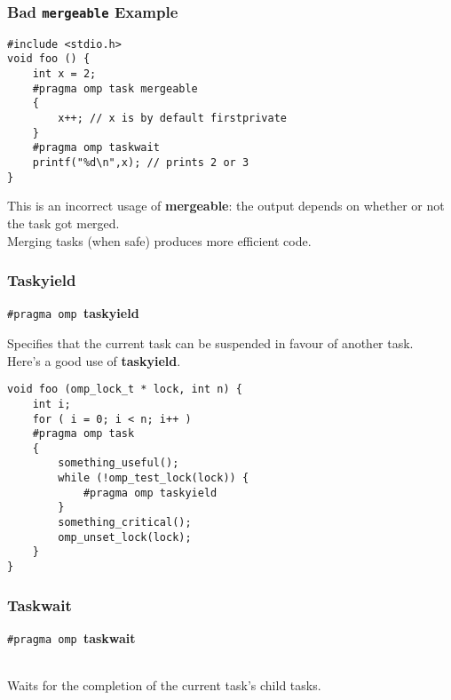 \begin{frame}[fragile]
  \frametitle{Bad {\tt mergeable} Example}

  
  \begin{lstlisting}
#include <stdio.h>
void foo () {
    int x = 2;
    #pragma omp task mergeable
    {
        x++; // x is by default firstprivate
    }
    #pragma omp taskwait
    printf("%d\n",x); // prints 2 or 3
}
  \end{lstlisting}
  
    This is an incorrect usage of {\bf mergeable}: the output depends
      on whether or not the task got merged.\\[1em]
    Merging tasks (when safe) produces more efficient code.

  
\end{frame}

\begin{frame}[fragile]
  \frametitle{Taskyield}

  
  \begin{center}
    {\tt \#pragma omp }{\bf taskyield}
  \end{center}

    Specifies that the current task can be suspended in favour of another task.\\[1em]

  Here's a good use of {\bf taskyield}.

  \begin{lstlisting}
void foo (omp_lock_t * lock, int n) {
    int i;
    for ( i = 0; i < n; i++ )
    #pragma omp task
    {
        something_useful();
        while (!omp_test_lock(lock)) {
            #pragma omp taskyield
        }
        something_critical();
        omp_unset_lock(lock);
    }
}
  \end{lstlisting}
  
\end{frame}

\begin{frame}[fragile]
  \frametitle{Taskwait}

  

  \begin{center}
    {\tt \#pragma omp }{\bf taskwait}
  \end{center}~\\[1em]

     Waits for the completion of the current task's child tasks.
  

\end{frame}

